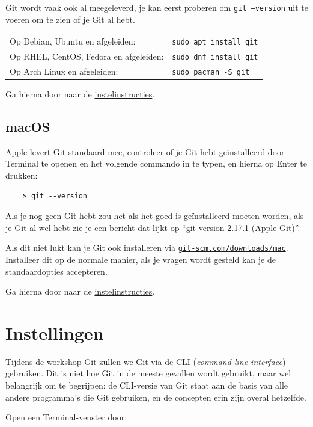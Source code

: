 \documentclass[a4paper]{extarticle}
\newcommand{\shell}[1]{\texttt{#1}}
\begin{document}
Git wordt vaak ook al meegeleverd, je kan eerst proberen om \shell{git --version} uit te voeren om te zien of je Git al
hebt.

	\begin{tabular}{ll}
	 Op Debian, Ubuntu en afgeleiden: 			&\shell{sudo apt install git} \\
	 Op RHEL, CentOS, Fedora en afgeleiden: 	&\shell{sudo dnf install git} \\
	 Op Arch Linux en afgeleiden: 				&\shell{sudo pacman -S git}
	\end{tabular}

Ga hierna door naar de \hyperref[instellen]{instelinstructies}.

\subsection{macOS}
Apple levert Git standaard mee, controleer of je Git hebt geïnstalleerd door Terminal te openen en het volgende commando
in te typen, en hierna op Enter te drukken:

\begin{verbatim}
	$ git --version
\end{verbatim}

Als je nog geen Git hebt zou het als het goed is geïnstalleerd moeten worden, als je Git al wel hebt zie je een bericht
dat lijkt op ``git version 2.17.1 (Apple Git)''.

Als dit niet lukt kan je Git ook installeren via
\href{https://git-scm.com/downloads/mac}{\texttt{git-scm.com/downloads/mac}}.\\
Installeer dit op de normale manier, als je vragen wordt gesteld kan je de standaardopties accepteren.

Ga hierna door naar de \hyperref[instellen]{instelinstructies}.

\section{Instellingen}
\label{instellen}
Tijdens de workshop Git zullen we Git via de CLI (\textit{command-line interface}) gebruiken. Dit is niet hoe Git in de
meeste gevallen wordt gebruikt, maar wel belangrijk om te begrijpen: de CLI-versie van Git staat aan de basis van alle
andere programma's die Git gebruiken, en de concepten erin zijn overal hetzelfde.

Open een Terminal-venster door:
\end{document}
